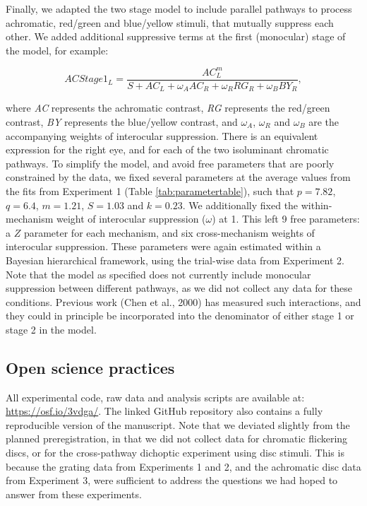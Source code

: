 \documentclass[
]{article}
\begin{document}
Finally, we adapted the two stage model to include parallel pathways to process achromatic, red/green and blue/yellow stimuli, that mutually suppress each other. We added additional suppressive terms at the first (monocular) stage of the model, for example:

\begin{equation}
ACStage1_L = \frac{AC_L^m}{S + AC_L + \omega_A AC_R + \omega_R RG_R + \omega_B BY_R},
\end{equation}

where \emph{AC} represents the achromatic contrast, \emph{RG} represents the red/green contrast, \emph{BY} represents the blue/yellow contrast, and \(\omega_A\), \(\omega_R\) and \(\omega_B\) are the accompanying weights of interocular suppression. There is an equivalent expression for the right eye, and for each of the two isoluminant chromatic pathways. To simplify the model, and avoid free parameters that are poorly constrained by the data, we fixed several parameters at the average values from the fits from Experiment 1 (Table \ref{tab:parametertable}), such that \(p=7.82\), \(q=6.4\), \(m=1.21\), \(S=1.03\) and \(k=0.23\). We additionally fixed the within-mechanism weight of interocular suppression (\(\omega\)) at 1. This left 9 free parameters: a \(Z\) parameter for each mechanism, and six cross-mechanism weights of interocular suppression. These parameters were again estimated within a Bayesian hierarchical framework, using the trial-wise data from Experiment 2. Note that the model as specified does not currently include monocular suppression between different pathways, as we did not collect any data for these conditions. Previous work (Chen et al., 2000) has measured such interactions, and they could in principle be incorporated into the denominator of either stage 1 or stage 2 in the model.

\hypertarget{open-science-practices}{%
\subsection{Open science practices}\label{open-science-practices}}

All experimental code, raw data and analysis scripts are available at: \url{https://osf.io/3vdga/}. The linked GitHub repository also contains a fully reproducible version of the manuscript. Note that we deviated slightly from the planned preregistration, in that we did not collect data for chromatic flickering discs, or for the cross-pathway dichoptic experiment using disc stimuli. This is because the grating data from Experiments 1 and 2, and the achromatic disc data from Experiment 3, were sufficient to address the questions we had hoped to answer from these experiments.
\end{document}
